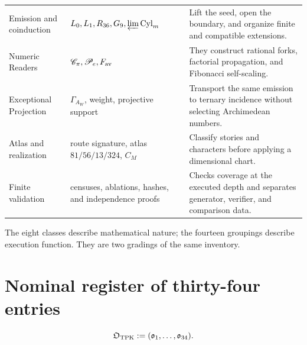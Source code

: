 \begin{longtable}{@{}p{}p{}p{}@{}}
Emission and coinduction&
\(L_0,L_1,R_{36},G_9,\varprojlim\operatorname{Cyl}_m\)&
Lift the seed, open the boundary, and organize finite and compatible extensions.\\

Numeric Readers&
\(\mathscr C_\pi,\mathscr P_e,F_{\rm av}\)&
They construct rational forks, factorial propagation, and Fibonacci self-scaling.\\

Exceptional Projection&
\(\Gamma_{A_W}\), weight, projective support&
Transport the same emission to ternary incidence without selecting Archimedean numbers.\\

Atlas and realization&
route signature, atlas \(81/56/13/324\), \(C_M\)&
Classify stories and characters before applying a dimensional chart.\\

Finite validation&
censuses, ablations, hashes, and independence proofs&
Checks coverage at the executed depth and separates generator, verifier, and comparison data.\\
\bottomrule
\end{longtable}
\endgroup

The eight classes describe mathematical nature; the fourteen groupings describe
execution function. They are two gradings of the same inventory.

\section{Nominal register of thirty-four entries}

\begin{equation}
 \mathfrak O_{\rm TPK}:=(\mathfrak o_1,\ldots,\mathfrak o_{34}).
 \label{eq:u006f-registro-operadores}
\end{equation}

